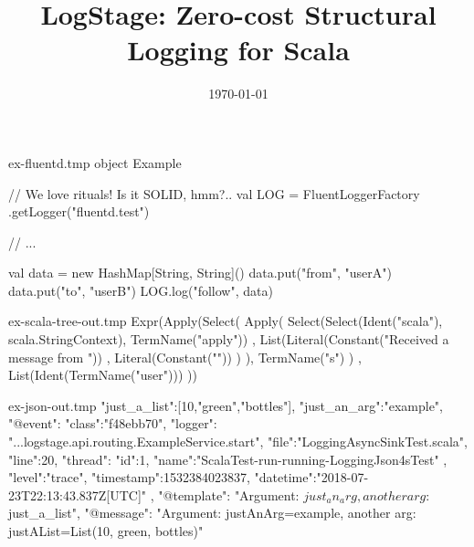 \documentclass[usenames,dvipsnames]{beamer}
\title[LogStage]{LogStage: Zero-cost Structural Logging for Scala}
\institute[Septimal Mind Ltd]
    {
    Septimal Mind Ltd\\
    \medskip
    \textit{team@7mind.io}
    }
\date{\today}
\begin{document}
\begin{VerbatimOut}{ex-fluentd.tmp}
object Example {
  // We love rituals! Is it SOLID, hmm?..
  val LOG = FluentLoggerFactory
    .getLogger("fluentd.test")

  // ...

  val data = 
      new HashMap[String, String]()
  data.put("from", "userA")
  data.put("to", "userB")
  LOG.log("follow", data)
}
\end{VerbatimOut}



\begin{VerbatimOut}{ex-scala-tree-out.tmp}
Expr(Apply(Select(
  Apply(
    Select(Select(Ident("scala"), scala.StringContext), 
      TermName("apply"))
      , List(Literal(Constant("Received a message from "))
          , Literal(Constant(""))
        )
  ),
  TermName("s")
  )
, List(Ident(TermName("user")))
))
\end{VerbatimOut}

\begin{VerbatimOut}{ex-json-out.tmp}
{
"just_a_list":[10,"green","bottles"],
"just_an_arg":"example",
"@event":{
  "class":"f48ebb70",
  "logger": "...logstage.api.routing.ExampleService.start",
  "file":"LoggingAsyncSinkTest.scala", "line":20,
  "thread":{ "id":1, "name":"ScalaTest-run-running-LoggingJson4sTest" },
  "level":"trace",
  "timestamp":1532384023837,
  "datetime":"2018-07-23T22:13:43.837Z[UTC]"
},
"@template":
"Argument: ${just_an_arg}, another arg: ${just_a_list}",
"@message":
"Argument: justAnArg=example, another arg: justAList=List(10, green, bottles)"
}
\end{VerbatimOut}

\end{document}
